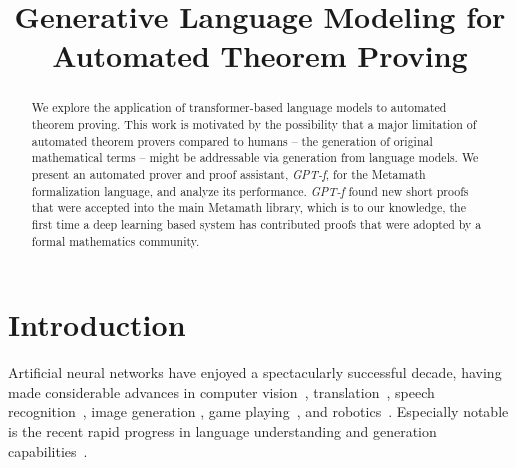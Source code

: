 \title{Generative Language Modeling for Automated Theorem Proving}

\begin{abstract}
We explore the application of transformer-based language models to automated theorem proving.  This work is motivated by the possibility that a major limitation of automated theorem provers compared to humans -- the generation of original mathematical terms -- might be addressable via generation from language models. We present an automated prover and proof assistant, \emph{GPT-f}, for the Metamath formalization language, and analyze its performance. \emph{GPT-f} found new short proofs that were accepted into the main Metamath library, which is to our knowledge, the first time a deep learning based system has contributed proofs that were adopted by a formal mathematics community.

\end{abstract}

\section{Introduction}

Artificial neural networks have enjoyed a spectacularly successful decade, having made considerable advances in computer vision~\cite{krizhevsky2012imagenet,he2016deep}, translation~\cite{sutskever2014sequence,bahdanau2014neural,wu2016google}, speech recognition~\cite{graves2014towards,amodei2016deep}, image generation \cite{goodfellow2014generative,radford2015unsupervised,karras2017progressive,karras2019style,chen2020generative}, game playing~\cite{silver2016mastering,berner2019dota,vinyals2019grandmaster}, and robotics~\cite{akkaya2019solving,levine2016end}.  Especially notable is the recent rapid progress in language understanding and generation capabilities~\cite{vaswani2017attention,radford2018improving,radford2019language,brown2020language,devlin2018bert}. 

